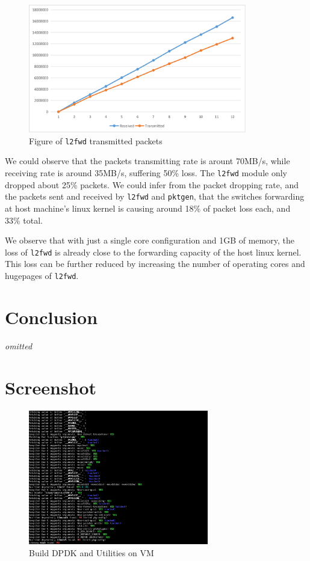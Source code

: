 \documentclass[12pt]{article}
\begin{document}
\begin{figure}[ht]
    \centering
    \includegraphics[width=0.85\textwidth]{figures/figure-l2fwd.png}
    \caption{Figure of \texttt{l2fwd} transmitted packets}
    \label{fig:transmitted}
\end{figure}


We could observe that the packets transmitting rate is arount 70MB/s, while receiving rate is around 35MB/s, suffering 50\% loss. The \texttt{l2fwd} module only dropped about 25\% packets. We could infer from the packet dropping rate, and the packets sent and received by \texttt{l2fwd} and \texttt{pktgen}, that the switches forwarding at host machine's linux kernel is causing around 18\% of packet loss each, and 33\% total. 

We observe that with just a single core configuration and 1GB of memory, the loss of \texttt{l2fwd} is already close to the forwarding capacity of the host linux kernel. This loss can be further reduced by increasing the number of operating cores and hugepages of \texttt{l2fwd}.

\section{Conclusion}

\emph{omitted}

\newpage
\section*{Screenshot}

\begin{figure}[ht]
    \centering
    \includegraphics[width=0.7\textwidth]{figures/build-dpdk.png}
    \caption{Build DPDK and Utilities on VM}
    \label{fig:build}
\end{figure}
\end{document}
